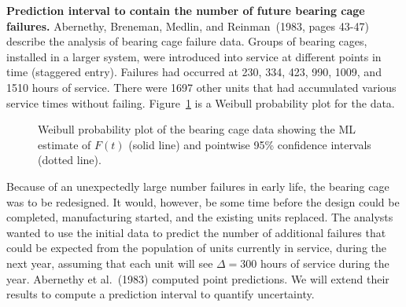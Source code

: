 \begin{example}
{\bf Prediction interval to contain the number of future bearing cage
failures.} 
Abernethy, Breneman, Medlin, and Reinman~(1983, pages 43-47) describe
the analysis of bearing cage failure data.  Groups of bearing cages,
installed in a larger system, were introduced into service at
different points in time (staggered entry).  Failures had occurred at
230, 334, 423, 990, 1009, and 1510 hours of service. There were 1697
other units that had accumulated various service times without
failing. Figure~\ref{figure:bcage.weib.mleprobplot.ps}
is a Weibull probability plot for the data.
\begin{figure}
\caption{Weibull probability plot of the bearing cage data
showing the ML estimate of $F(t)$ (solid line) and pointwise 95\%
confidence intervals (dotted line).}
\label{figure:bcage.weib.mleprobplot.ps}
\end{figure}
Because of an unexpectedly large
number failures in early life, the
bearing cage was to be redesigned. It would, however, be some time
before the design could be completed, manufacturing started, and the
existing units replaced. The analysts wanted to use the initial data
to predict the number of additional failures that could be expected
from the population of units currently in service, during the next
year, assuming that each unit will see $\Delta  = 300$ hours of service during
the year.  Abernethy et al.~(1983) computed point predictions.  We will
extend their results to compute a prediction interval to quantify
uncertainty.



\end{example}
